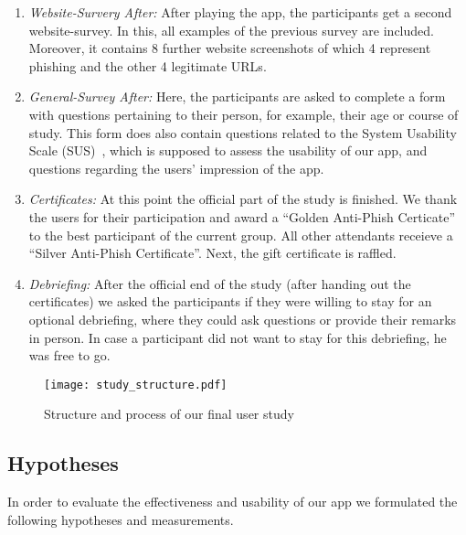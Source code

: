 \begin{enumerate}
	\item \textit{Website-Survery After:} After playing the app, the participants get a second website-survey.
 In this, all examples of the previous survey are included.
 Moreover, it contains 8 further website screenshots of which 4 represent phishing and the other 4 legitimate URLs.

	\item \textit{General-Survey After:} Here, the participants are asked to complete a form with questions pertaining to their person, for example, their age or course of study.
 This form does also contain questions related to the System Usability Scale (SUS)~\cite{sus}, which is supposed to assess the usability of our app, and questions regarding the users' impression of the app.
	
	\item \textit{Certificates:} At this point the official part of the study is finished.
We thank the users for their participation and award a ``Golden Anti-Phish Certicate'' to the best participant of the current group.
All other attendants receieve a ``Silver Anti-Phish Certificate''.
Next, the gift certificate is raffled.

	\item \textit{Debriefing:} After the official end of the study (after handing out the certificates) we asked the participants if they were willing to stay for an optional debriefing, where they could ask questions or provide their remarks in person. In case a participant did not want to stay for this debriefing, he was free to go.
\end{enumerate}



\begin{figure}[hHtbp]
\centering
\texttt{[image: study\_structure.pdf]}%
\caption{Structure and process of our final user study}%
\label{fig:study_structure}%
\end{figure}

\subsection{Hypotheses}
In order to evaluate the effectiveness and usability of our app we formulated the following hypotheses and measurements.


